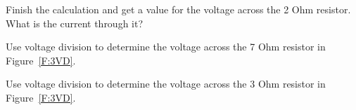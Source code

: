 \begin{blevel}
Finish the calculation and get a value for the voltage across the 2 Ohm resistor. What is the current through it? 
\end{blevel}

\begin{clevel}
Use voltage division to determine the voltage across the 7 Ohm resistor in Figure~\ref{F:3VD}. 
\end{clevel}

\begin{clevel}
Use voltage division to determine the voltage across the 3 Ohm resistor in Figure~\ref{F:3VD}. 
\end{clevel}
